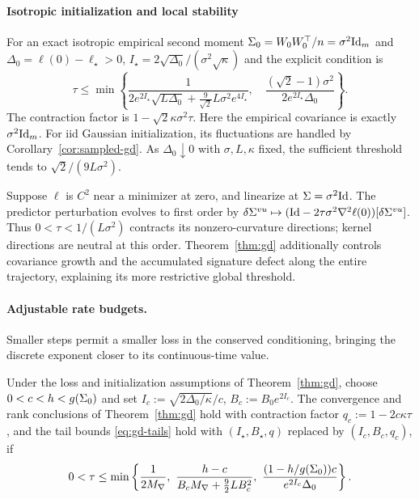 \paragraph{Isotropic initialization and local stability}
For an exact isotropic empirical second moment
$\Sigma_0=W_0W_0^\top/n=\sigma^2\mathrm{Id}_m$ and $\Delta_0=\ell(0)-\ell_\star>0$,
$I_\star=2\sqrt{\Delta_0}/(\sigma^2\sqrt\kappa)$ and the explicit
condition is
\[
 \tau\le\min\left\{
 \frac1{2e^{2I_\star}\sqrt{L\Delta_0}
                 +\frac9{\sqrt2}L\sigma^2e^{4I_\star}},\quad
 \frac{(\sqrt2-1)\sigma^2}{2e^{2I_\star}\Delta_0}
 \right\}.
\]
The contraction factor is $1-\sqrt2\kappa\sigma^2\tau$.
Here the empirical covariance is exactly $\sigma^2\mathrm{Id}_m$. For iid Gaussian
initialization, its fluctuations are handled by Corollary~\ref{cor:sampled-gd}.
As $\Delta_0\downarrow0$ with $\sigma,L,\kappa$ fixed, the sufficient
threshold tends to $\sqrt2/(9L\sigma^2)$.


\begin{remark}\label{rem:gd-local}
Suppose $\ell$ is $C^2$ near a minimizer at zero, and linearize at
$\Sigma=\sigma^2\mathrm{Id}$. The predictor perturbation evolves to first order by
$\delta\Sigma^{vu}\mapsto(\mathrm{Id}-2\tau\sigma^2\nabla^2\ell(0))[\delta\Sigma^{vu}]$.
Thus $0<\tau<1/(L\sigma^2)$ contracts its nonzero-curvature directions;
kernel directions are neutral at this order. Theorem~\ref{thm:gd} additionally controls
covariance growth and the accumulated signature defect along the entire
trajectory, explaining its more restrictive global threshold.
\end{remark}

\paragraph{Adjustable rate budgets.}
Smaller steps permit a smaller loss in the conserved conditioning,
bringing the discrete exponent closer to its continuous-time value.
\begin{proposition}\label{prop:gd-adjustable}
Under the loss and initialization assumptions of Theorem~\ref{thm:gd},
choose $0<c<h<g(\Sigma_0)$ and set
$I_c:=\sqrt{2\Delta_0/\kappa}/c$, $B_c:=B_0e^{2I_c}$.
The convergence and rank conclusions of Theorem~\ref{thm:gd} hold with
contraction factor $q_c:=1-2c\kappa\tau$, and the tail bounds
\eqref{eq:gd-tails} hold with $(I_\star,B_\star,q)$ replaced by
$(I_c,B_c,q_c)$, if
\[
 0<\tau\le\min\left\{\frac1{2M_{\nabla}},\
 \frac{h-c}{B_cM_{\nabla}+\frac92LB_c^2},\
 \frac{(1-h/g(\Sigma_0))c}{e^{2I_c}\Delta_0}\right\}.
\]
\end{proposition}

